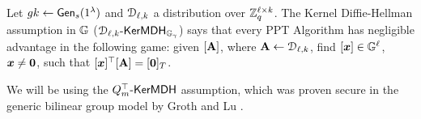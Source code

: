 \begin{definition} Let  ${gk} 
\gets\mathsf{Gen}_s(1^\lambda)$ and $\mathcal{D}_{\ell,k}$ a distribution over $\mathbb{Z}_q^{\ell\times k}$.
The Kernel Diffie-Hellman assumption in $\mathbb{G}$ ($\mathcal{D}_{\ell,k}\mbox{-}\mathsf{KerMDH}_{\mathbb{G}_\gamma}$) says that every PPT Algorithm has negligible advantage in the following  game: given $[\mathbf{{A}}]$, where $\mathbf{{A}} \gets \mathcal{D}_{\ell,k}$, find $[{\boldsymbol{x}}] \in \mathbb{G}^{\ell}$, ${\boldsymbol{x}} \neq {\boldsymbol{0}}$, such that 
$[{\boldsymbol{x}}]^{\top}[\mathbf{{A}}]=[{\boldsymbol{0}}]_T$. 
\end{definition}

We will be using the $Q_m^\top\mbox{-}\mathsf{KerMDH}$ assumption, which was proven secure in the generic bilinear group model by Groth and Lu \cite{AC:GroLu07}.